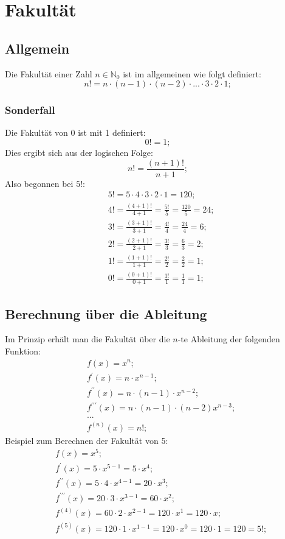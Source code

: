 \documentclass[a4paper]{article}
\begin{document}
\newpage
\section{Fakult\"at}

\subsection{Allgemein}
Die Fakult\"at einer Zahl $n \in \mathbb{N}_0$ ist im allgemeinen wie folgt definiert:
\[
	n! = n \cdot (n - 1) \cdot (n - 2) \cdot ... \cdot 3 \cdot 2 \cdot 1 ;
\]
\subsubsection{Sonderfall}
Die Fakult\"at von 0 ist mit 1 definiert:
\[
	0! = 1;
\]
Dies ergibt sich aus der logischen Folge:
\[
	n! = \frac{(n + 1)!}{n + 1} ;
\]
Also begonnen bei $5!$:
\begin{align*}
	& 5! = 5 \cdot 4 \cdot 3 \cdot 2 \cdot 1 = 120 ;
	\\
	& 4! = \frac{(4 + 1)!}{4 + 1} = \frac{5!}{5} = \frac{120}{5} = 24 ;
	\\
	& 3! = \frac{(3 + 1)!}{3 + 1} = \frac{4!}{4} = \frac{24}{4} = 6 ;
	\\
	& 2! = \frac{(2 + 1)!}{2 + 1} = \frac{3!}{3} = \frac{6}{3} = 2 ;
	\\
	& 1! = \frac{(1 + 1)!}{1 + 1} = \frac{2!}{2} = \frac{2}{2} = 1 ;
	\\
	& 0! = \frac{(0 + 1)!}{0 + 1} = \frac{1!}{1} = \frac{1}{1} = 1 ;
\end{align*}

\subsection{Berechnung \"uber die Ableitung}
Im Prinzip erh\"alt man die Fakult\"at \"uber die $n$-te Ableitung der folgenden Funktion:
\begin{align*}
	& f(x) = x^n ;
	\\
	& f^\prime(x) = n \cdot x^{n - 1} ;
	\\
	& f^{\prime\prime}(x) = n \cdot \left( n - 1 \right) \cdot x^{n - 2} ;
	\\
	& f^{\prime\prime\prime}(x) = n \cdot \left( n - 1 \right) \cdot \left( n - 2 \right)x^{n - 3} ;
	\\
	& ...
	\\
	& f^{(n)}(x) = n! ;
\end{align*}
Beispiel zum Berechnen der Fakult\"at von 5:
\begin{align*}
	& f(x) = x^5 ;
	\\
	& f^\prime(x) = 5 \cdot x^{5 - 1} = 5 \cdot x^4 ;
	\\
	& f^{\prime\prime}(x) = 5 \cdot 4 \cdot x^{4 - 1} = 20 \cdot x^3 ;
	\\
	& f^{\prime\prime\prime}(x) = 20 \cdot 3 \cdot x^{3 - 1} = 60 \cdot x^2;
	\\
	& f^{(4)}(x) = 60 \cdot 2 \cdot x^{2 - 1} = 120 \cdot x^1 = 120 \cdot x ;
	\\
	& f^{(5)}(x) = 120 \cdot 1 \cdot x^{1 - 1} = 120 \cdot x^0 = 120 \cdot 1 = 120 = 5! ;
\end{align*}
\end{document}
